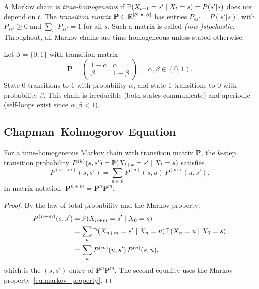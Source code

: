 \documentclass[11pt,a4paper]{article}
\begin{document}
\begin{definition}
\label{def:transition_matrix}
A Markov chain is \emph{time-homogeneous} if
$\mathbb{P}(X_{t+1} = s' \mid X_t = s) = P(s'|s)$ does not depend on
$t$.  The \emph{transition matrix}
$\mathbf{P} \in \mathbb{R}^{|\mathcal{S}| \times |\mathcal{S}|}$ has
entries $P_{ss'} = P(s'|s)$, with $P_{ss'} \geq 0$ and
$\sum_{s'} P_{ss'} = 1$ for all $s$.
Such a matrix is called \emph{(row-)stochastic}.
Throughout, all Markov chains are time-homogeneous unless stated
otherwise.
\end{definition}

\begin{example}
\label{ex:two_state}
Let $\mathcal{S} = \{0, 1\}$ with transition matrix
\begin{equation}
  \mathbf{P} = \begin{pmatrix}
    1-\alpha & \alpha \\
    \beta & 1-\beta
  \end{pmatrix},
  \quad \alpha, \beta \in (0, 1).
\end{equation}
State $0$ transitions to $1$ with probability $\alpha$, and
state $1$ transitions to $0$ with probability $\beta$.  This
chain is irreducible (both states communicate) and aperiodic
(self-loops exist since $\alpha, \beta < 1$).
\end{example}

\subsection{Chapman--Kolmogorov Equation}
\label{subsec:ck}

\begin{keyresult}[title={Chapman--Kolmogorov Equation}]
\begin{theorem}
\label{thm:chapman_kolmogorov}
For a time-homogeneous Markov chain with transition matrix
$\mathbf{P}$, the $k$-step transition probability
$P^{(k)}(s, s') = \mathbb{P}(X_{t+k} = s' \mid X_t = s)$ satisfies
\begin{equation}
  P^{(n+m)}(s, s')
  = \sum_{u \in \mathcal{S}} P^{(n)}(s, u)\, P^{(m)}(u, s').
  \label{eq:ck}
\end{equation}
In matrix notation: $\mathbf{P}^{n+m} = \mathbf{P}^n
\mathbf{P}^m$.
\end{theorem}
\end{keyresult}

\begin{proof}
By the law of total probability and the Markov property:
\begin{align}
  P^{(n+m)}(s, s')
  &= \mathbb{P}(X_{n+m} = s' \mid X_0 = s) \nonumber\\
  &= \sum_{u} \mathbb{P}(X_{n+m} = s' \mid X_n = u)\,
    \mathbb{P}(X_n = u \mid X_0 = s) \nonumber\\
  &= \sum_{u} P^{(m)}(u, s')\, P^{(n)}(s, u),
\end{align}
which is the $(s, s')$ entry of $\mathbf{P}^n \mathbf{P}^m$.
The second equality uses the Markov
property~\eqref{eq:markov_property}.
\end{proof}
\end{document}
